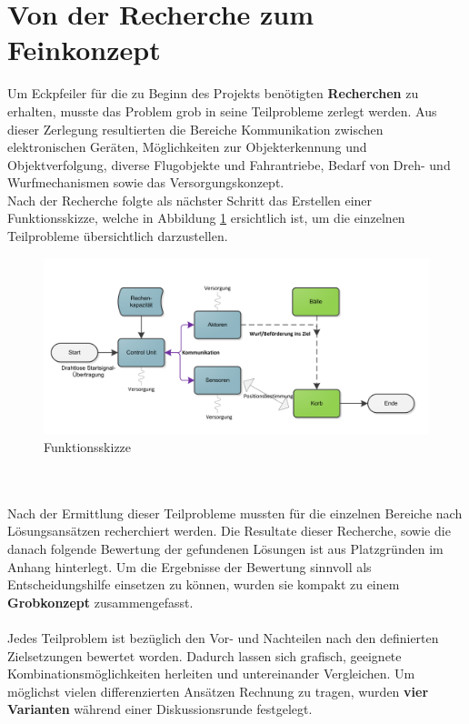 ﻿\section{Von der Recherche zum Feinkonzept}
Um Eckpfeiler für die zu Beginn des Projekts benötigten \textbf{Recherchen} zu erhalten, musste das Problem grob in seine Teilprobleme zerlegt werden. Aus dieser Zerlegung resultierten die Bereiche Kommunikation zwischen elektronischen Geräten, Möglichkeiten zur Objekterkennung und Objektverfolgung, diverse Flugobjekte und Fahrantriebe, Bedarf von Dreh- und Wurfmechanismen sowie das Versorgungskonzept. \\
Nach der Recherche folgte als nächster Schritt das Erstellen einer  Funktionsskizze, welche in Abbildung \ref{fig:Funktionsskizze} ersichtlich ist, um die einzelnen Teilprobleme übersichtlich darzustellen.\\
\begin{figure}[h!]
	\centering
	\includegraphics[width=1\textwidth]{Enddokumentation/Varianten/Bilder/Funktionsskizze.png}
	\caption{Funktionsskizze}
	\label{fig:Funktionsskizze}
\end{figure}
\\\\
Nach der Ermittlung dieser Teilprobleme mussten für die einzelnen Bereiche nach Lösungsansätzen recherchiert werden. Die Resultate dieser Recherche, sowie die danach folgende Bewertung der gefundenen Lösungen ist aus Platzgründen im Anhang hinterlegt. Um die Ergebnisse der Bewertung sinnvoll als Entscheidungshilfe einsetzen zu können, wurden sie kompakt zu einem \textbf{Grobkonzept} zusammengefasst.\\
\\
Jedes Teilproblem ist bezüglich den Vor- und Nachteilen nach den definierten Zielsetzungen bewertet worden. Dadurch lassen sich grafisch, geeignete Kombinationsmöglichkeiten herleiten und untereinander Vergleichen. Um möglichst vielen differenzierten Ansätzen Rechnung zu tragen, wurden \textbf{vier Varianten} während einer Diskussionsrunde festgelegt.\\
